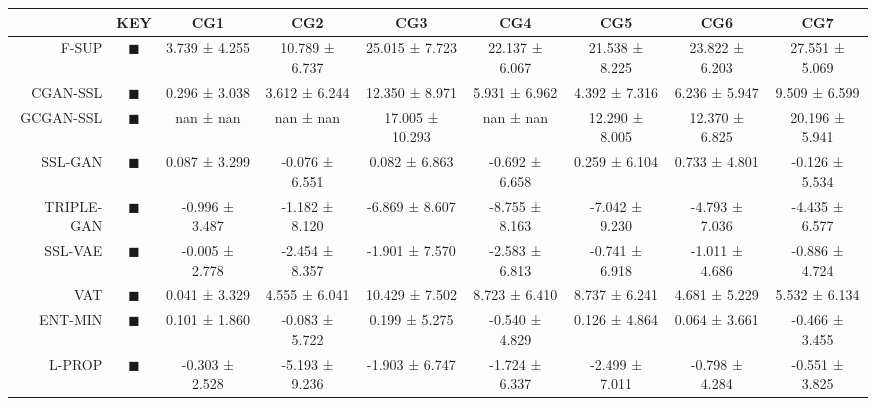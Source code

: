 \begin{tabular}{rcccccccc}
\toprule
{} &                                                                      KEY &             CG1 &             CG2 &              CG3 &             CG4 &             CG5 &             CG6 &             CG7 \\
\midrule
F-SUP      &           \textcolor{FULLY_SUPERVISED_CLASSIFIER}{\LARGE $\blacksquare$} &   3.739 ± 4.255 &  10.789 ± 6.737 &   25.015 ± 7.723 &  22.137 ± 6.067 &  21.538 ± 8.225 &  23.822 ± 6.203 &  27.551 ± 5.069 \\
CGAN-SSL   &   \textcolor{CGAN_BASIC_DJ_SUPERVISED_CLASSIFIER}{\LARGE $\blacksquare$} &   0.296 ± 3.038 &   3.612 ± 6.244 &   12.350 ± 8.971 &   5.931 ± 6.962 &   4.392 ± 7.316 &   6.236 ± 5.947 &   9.509 ± 6.599 \\
GCGAN-SSL  &  \textcolor{CGAN_GUMBEL_DJ_SUPERVISED_CLASSIFIER}{\LARGE $\blacksquare$} &       nan ± nan &       nan ± nan &  17.005 ± 10.293 &       nan ± nan &  12.290 ± 8.005 &  12.370 ± 6.825 &  20.196 ± 5.941 \\
SSL-GAN    &                               \textcolor{SSL_GAN}{\LARGE $\blacksquare$} &   0.087 ± 3.299 &  -0.076 ± 6.551 &    0.082 ± 6.863 &  -0.692 ± 6.658 &   0.259 ± 6.104 &   0.733 ± 4.801 &  -0.126 ± 5.534 \\
TRIPLE-GAN &                            \textcolor{TRIPLE_GAN}{\LARGE $\blacksquare$} &  -0.996 ± 3.487 &  -1.182 ± 8.120 &   -6.869 ± 8.607 &  -8.755 ± 8.163 &  -7.042 ± 9.230 &  -4.793 ± 7.036 &  -4.435 ± 6.577 \\
SSL-VAE    &                               \textcolor{SSL_VAE}{\LARGE $\blacksquare$} &  -0.005 ± 2.778 &  -2.454 ± 8.357 &   -1.901 ± 7.570 &  -2.583 ± 6.813 &  -0.741 ± 6.918 &  -1.011 ± 4.686 &  -0.886 ± 4.724 \\
VAT        &                                   \textcolor{VAT}{\LARGE $\blacksquare$} &   0.041 ± 3.329 &   4.555 ± 6.041 &   10.429 ± 7.502 &   8.723 ± 6.410 &   8.737 ± 6.241 &   4.681 ± 5.229 &   5.532 ± 6.134 \\
ENT-MIN    &                  \textcolor{ENTROPY_MINIMISATION}{\LARGE $\blacksquare$} &   0.101 ± 1.860 &  -0.083 ± 5.722 &    0.199 ± 5.275 &  -0.540 ± 4.829 &   0.126 ± 4.864 &   0.064 ± 3.661 &  -0.466 ± 3.455 \\
L-PROP     &                     \textcolor{LABEL_PROPAGATION}{\LARGE $\blacksquare$} &  -0.303 ± 2.528 &  -5.193 ± 9.236 &   -1.903 ± 6.747 &  -1.724 ± 6.337 &  -2.499 ± 7.011 &  -0.798 ± 4.284 &  -0.551 ± 3.825 \\

\end{tabular}
